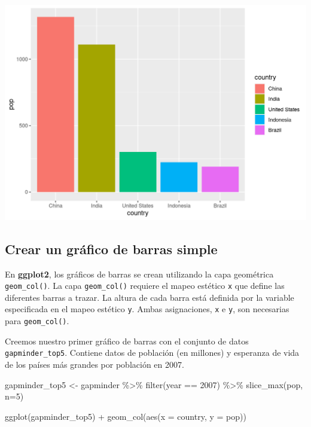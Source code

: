 \documentclass[
]{book}
\newenvironment{Shaded}{\begin{snugshade}}{\end{snugshade}}
\newcommand{\AttributeTok}[1]{\textcolor[rgb]{0.77,0.63,0.00}{#1}}
\newcommand{\DecValTok}[1]{\textcolor[rgb]{0.00,0.00,0.81}{#1}}
\newcommand{\FunctionTok}[1]{\textcolor[rgb]{0.00,0.00,0.00}{#1}}
\newcommand{\NormalTok}[1]{#1}
\newcommand{\OtherTok}[1]{\textcolor[rgb]{0.56,0.35,0.01}{#1}}
\newcommand{\SpecialCharTok}[1]{\textcolor[rgb]{0.00,0.00,0.00}{#1}}
\begin{document}
\includegraphics{img/bar1.png}

\hypertarget{crear-un-gruxe1fico-de-barras-simple}{%
\subsection{Crear un gráfico de barras simple}\label{crear-un-gruxe1fico-de-barras-simple}}

En \textbf{ggplot2}, los gráficos de barras se crean utilizando la capa geométrica \texttt{geom\_col()}. La capa \texttt{geom\_col()} requiere el mapeo estético \texttt{x} que define las diferentes barras a trazar. La altura de cada barra está definida por la variable especificada en el mapeo estético \texttt{y}. Ambas asignaciones, \texttt{x} e \texttt{y}, son necesarias para \texttt{geom\_col()}.

Creemos nuestro primer gráfico de barras con el conjunto de datos \texttt{gapminder\_top5}. Contiene datos de población (en millones) y esperanza de vida de los países más grandes por población en 2007.

\begin{Shaded}
\begin{Highlighting}[]
\NormalTok{gapminder\_top5 }\OtherTok{\textless{}{-}}\NormalTok{ gapminder }\SpecialCharTok{\%\textgreater{}\%}
  \FunctionTok{filter}\NormalTok{(year }\SpecialCharTok{==} \DecValTok{2007}\NormalTok{) }\SpecialCharTok{\%\textgreater{}\%}
  \FunctionTok{slice\_max}\NormalTok{(pop, }\AttributeTok{n=}\DecValTok{5}\NormalTok{)}
\end{Highlighting}
\end{Shaded}

\begin{Shaded}
\begin{Highlighting}[]
\FunctionTok{ggplot}\NormalTok{(gapminder\_top5) }\SpecialCharTok{+} 
  \FunctionTok{geom\_col}\NormalTok{(}\FunctionTok{aes}\NormalTok{(}\AttributeTok{x =}\NormalTok{ country, }\AttributeTok{y =}\NormalTok{ pop))}
\end{Highlighting}
\end{Shaded}
\end{document}
